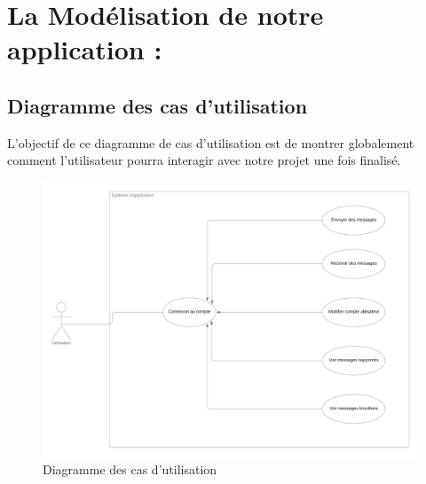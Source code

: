 \documentclass[french]{report}
\begin{document}
\section{\huge La Modélisation de notre application :}
\subsection{\LARGE Diagramme des cas d'utilisation }
\LARGE L'objectif de ce diagramme de cas d'utilisation est de montrer globalement comment l'utilisateur pourra interagir avec notre projet une fois finalisé.\\
\begin{figure}[H]
    \centering
    \includegraphics[width=1\textwidth]{DCU}
    \caption{Diagramme des cas d'utilisation}
    \label{fig:DCU}
\end{figure}
\end{document}

